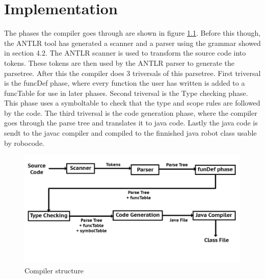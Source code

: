 \chapter{Implementation}
The phases the compiler goes through are shown in figure \ref{cs}. Before this though, the ANTLR tool has generated a scanner and a parser using the grammar showed in section 4.2. The ANTLR scanner is used to transform the source code into tokens. These tokens are then used by the ANTLR parser to generate the parsetree. After this the compiler does 3 triversals of this parsetree. First triversal is the funcDef phase, where every function the user has written is added to a funcTable for use in later phases. Second triversal is the Type checking phase. This phase uses a symboltable to check that the type and scope rules are followed by the code. The third triversal is the code generation phase, where the compiler goes through the parse tree and translates it to java code. Lastly the java code is sendt to the javac compiler and compiled to the finnished java robot class usable by robocode.

\begin{figure}[h]
\centering
\includegraphics[scale=0.35]{billeder/compilerStructure}
\caption{Compiler structure}
\label{cs}
\end{figure}


